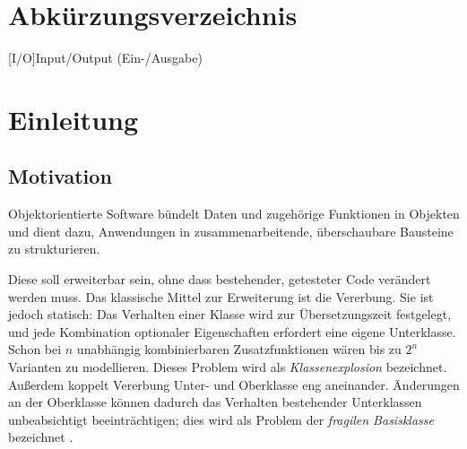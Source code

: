 \documentclass[a4paper,11pt,toc=listof,toc=bibliography]{scrartcl}
\begin{document}
\clearpage
\tableofcontents

\clearpage
\listoffigures

\clearpage
\listoftables

\clearpage
\lstlistoflistings

\clearpage
\section*{Abkürzungsverzeichnis}
\begin{acronym}[GoF]
  [I/O]{Input/Output (Ein-/Ausgabe)}
\end{acronym}

\clearpage
{}

\section{Einleitung}
\label{sec:einleitung}

\subsection{Motivation}
Objektorientierte Software bündelt Daten und zugehörige Funktionen in Objekten und dient dazu, Anwendungen in zusammenarbeitende, überschaubare Bausteine zu strukturieren.

Diese soll erweiterbar sein, ohne dass bestehender, getesteter Code verändert werden muss. Das klassische Mittel zur Erweiterung ist die Vererbung. Sie ist jedoch statisch: Das Verhalten einer Klasse wird zur Übersetzungszeit festgelegt, und jede Kombination optionaler Eigenschaften erfordert eine eigene Unterklasse. Schon bei $n$ unabhängig kombinierbaren Zusatzfunktionen wären bis zu $2^n$ Varianten zu modellieren. Dieses Problem wird als \emph{Klassenexplosion} bezeichnet. Außerdem koppelt Vererbung Unter- und Oberklasse eng aneinander. Änderungen an der Oberklasse können dadurch das Verhalten bestehender Unterklassen unbeabsichtigt beeinträchtigen; dies wird als Problem der \emph{fragilen Basisklasse} bezeichnet \cite{MS98,Blo18}.
\end{document}
